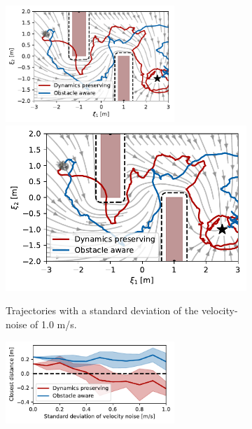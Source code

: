 \begin{figure}[htbp]
    \centering
    \begin{subfigure}{\columnwidth}
	\centering
	\ifthesis
    \includegraphics[width=0.7\textwidth]{figures/trajectory_velocity_noise}
	\else
    \includegraphics[width=\textwidth]{figures/trajectory_velocity_noise}
	\fi
    \caption{Trajectories with a standard deviation of the velocity-noise of 1.0 m/s.}
    \label{fig:trajectory_velocity_noise}
    \end{subfigure}
    \begin{subfigure}{\columnwidth}
	\centering
	\ifthesis
    \includegraphics[width=0.7\textwidth]{figures/comparison_velocity_noise}

\end{subfigure}
\end{figure}
